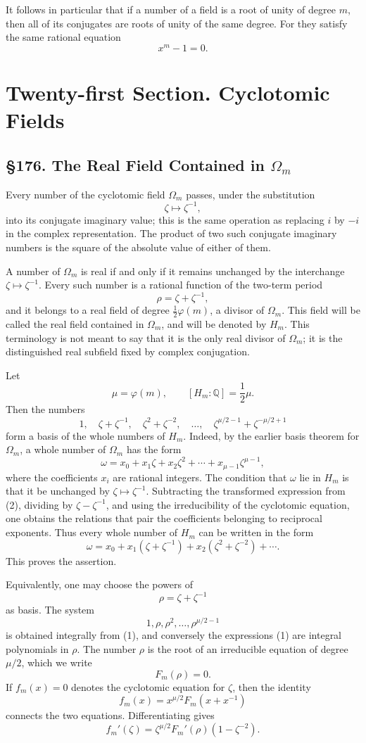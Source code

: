 \documentclass[11pt,a4paper]{book}
\newcommand{\webersection}[2]{\clearpage\section*{\S #1. #2}}
\newcommand{\booktitle}[1]{\clearpage\chapter*{#1}}
\newcommand{\zetaS}{\zeta}
\providecommand{\Om}{\Omega_m}
\providecommand{\Hm}{H_m}
\begin{document}
It follows in particular that if a number of a field is a root of unity of degree \(m\), then all of its conjugates are roots of unity of the same degree.  For they satisfy the same rational equation
\[
  x^m-1=0.
\]

\booktitle{Twenty-first Section. Cyclotomic Fields}

\webersection{176}{The Real Field Contained in \(\Om\)}

Every number of the cyclotomic field \(\Om\) passes, under the substitution
\[
  \zetaS\longmapsto \zetaS^{-1},
\]
into its conjugate imaginary value; this is the same operation as replacing \(i\) by \(-i\) in the complex representation.  The product of two such conjugate imaginary numbers is the square of the absolute value of either of them.

A number of \(\Om\) is real if and only if it remains unchanged by the interchange \(\zetaS\mapsto \zetaS^{-1}\).  Every such number is a rational function of the two-term period
\[
  \rho=\zetaS+\zetaS^{-1},
\]
and it belongs to a real field of degree \(\frac12\varphi(m)\), a divisor of \(\Om\).  This field will be called the real field contained in \(\Om\), and will be denoted by \(\Hm\).  This terminology is not meant to say that it is the only real divisor of \(\Om\); it is the distinguished real subfield fixed by complex conjugation.

Let
\[
  \mu=\varphi(m),\qquad [\Hm:\mathbb Q]=\frac12\mu.
\]
Then the numbers
\[
  1,
  \quad \zetaS+\zetaS^{-1},
  \quad \zetaS^2+\zetaS^{-2},
  \quad \ldots,
  \quad \zetaS^{\mu/2-1}+\zetaS^{-\mu/2+1}
\tag{1}
\]
form a basis of the whole numbers of \(\Hm\).  Indeed, by the earlier basis theorem for \(\Om\), a whole number of \(\Om\) has the form
\[
  \omega=x_0+x_1\zetaS+x_2\zetaS^2+\cdots+x_{\mu-1}\zetaS^{\mu-1},
\tag{2}
\]
where the coefficients \(x_i\) are rational integers.  The condition that \(\omega\) lie in \(\Hm\) is that it be unchanged by \(\zetaS\mapsto\zetaS^{-1}\).  Subtracting the transformed expression from (2), dividing by \(\zetaS-\zetaS^{-1}\), and using the irreducibility of the cyclotomic equation, one obtains the relations that pair the coefficients belonging to reciprocal exponents.  Thus every whole number of \(\Hm\) can be written in the form
\[
  \omega=x_0+x_1(\zetaS+\zetaS^{-1})+x_2(\zetaS^2+\zetaS^{-2})+\cdots.
\tag{3}
\]
This proves the assertion.

Equivalently, one may choose the powers of
\[
  \rho=\zetaS+\zetaS^{-1}
\]
as basis.  The system
\[
  1,\rho,\rho^2,\ldots,\rho^{\mu/2-1}
\tag{4}
\]
is obtained integrally from (1), and conversely the expressions (1) are integral polynomials in \(\rho\).  The number \(\rho\) is the root of an irreducible equation of degree \(\mu/2\), which we write
\[
  F_m(\rho)=0.
\]
If \(f_m(x)=0\) denotes the cyclotomic equation for \(\zetaS\), then the identity
\[
  f_m(x)=x^{\mu/2}F_m(x+x^{-1})
\tag{5}
\]
connects the two equations.  Differentiating gives
\[
  f_m'(\zetaS)=\zetaS^{\mu/2}F_m'(\rho)(1-\zetaS^{-2}).
\tag{6}
\]
\end{document}
